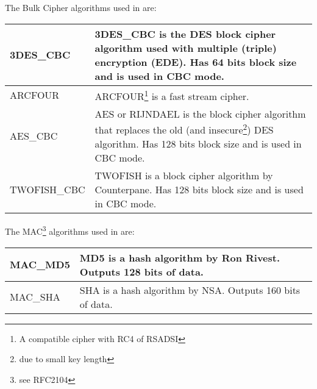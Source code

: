 \addvspace{1.5cm}
\par

 The Bulk Cipher algorithms used in \gnutls are: 
\par
\begin{tabular}{|l|p{9cm}|}

\hline
3DES\_CBC & 3DES\_CBC is the DES block cipher algorithm used with multiple (triple)
encryption (EDE). Has 64 bits block size and is used in CBC mode.
\\
\hline
ARCFOUR & ARCFOUR\footnote{A compatible cipher with RC4 of RSADSI} is a
fast stream cipher.
\\
\hline
AES\_CBC & AES or RIJNDAEL is the block cipher algorithm that replaces the old 
(and insecure\footnote{due to small key length}) DES algorithm. Has
128 bits block size and is used in CBC mode.
\\
\hline
TWOFISH\_CBC & TWOFISH is a block cipher algorithm by Counterpane. Has
128 bits block size and is used in CBC mode.
\\
\hline
\end{tabular}

\addvspace{1.5cm}
\par
 The MAC\footnote{see RFC2104} algorithms used in \gnutls are: 
\par

\begin{tabular}{|l|p{9cm}|}

\hline
MAC\_MD5 & MD5 is a hash algorithm by Ron Rivest. Outputs 128 bits of data.
\\
\hline
MAC\_SHA & SHA is a hash algorithm by NSA. Outputs 160 bits of data.
\\
\hline
\end{tabular}

